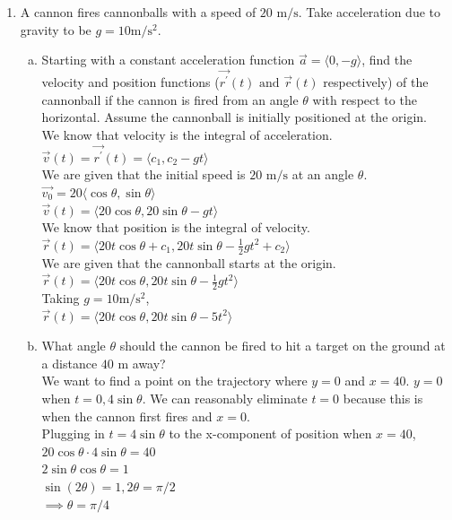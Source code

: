 \begin{enumerate}
	\item A cannon fires cannonballs with a speed of $20 \text{ m} / \text{s}$. Take acceleration due to gravity to be $g = 10 \text{m} / \text{s}^2$.
	\begin{enumerate}[a.]
		\item Starting with a constant acceleration function $\vec{a} = \langle 0, -g \rangle$, find the velocity and position functions ($\vec{r^\prime}(t) \text{ and } \vec{r}(t)$ respectively) of the cannonball if the cannon is fired from an angle $\theta$ with respect to the horizontal. Assume the cannonball is initially positioned at the origin.\\
		\indent
		We know that velocity is the integral of acceleration.\\
		$\vec{v}(t) = \vec{r^\prime}(t) = \langle c_1, c_2-gt \rangle$\\
		We are given that the initial speed is $20 \text{ m} / \text{s}$ at an angle $\theta$.\\
		$\vec{v_0} = 20\langle \cos{\theta}, \sin{\theta} \rangle$\\
		$\vec{v}(t) = \langle 20\cos{\theta}, 20\sin{\theta}-gt \rangle$\\
		We know that position is the integral of velocity.\\
		$\vec{r}(t) = \langle 20t\cos{\theta} + c_1, 20t\sin{\theta} - \frac{1}{2}gt^2 + c_2 \rangle$\\
		We are given that the cannonball starts at the origin.\\
		$\vec{r}(t) = \langle 20t\cos{\theta}, 20t\sin{\theta} - \frac{1}{2}gt^2 \rangle$\\
		Taking $g = 10 \text{m} / \text{s}^2$,\\
		$\vec{r}(t) = \langle 20t\cos{\theta}, 20t\sin{\theta}-5t^2 \rangle$\\
			
		\item What angle $\theta$ should the cannon be fired to hit a target on the ground at a distance $40\text{ m}$ away?\\
		\indent
		We want to find a point on the trajectory where $y = 0$ and $x = 40$.
		$y = 0$ when $t = 0, 4\sin{\theta}$. We can reasonably eliminate $t = 0$ because this is when the cannon first fires and $x = 0$.\\
		Plugging in $t = 4\sin{\theta}$ to the x-component of position when $x = 40$,\\
		$20\cos{\theta} \cdot 4\sin{\theta} = 40$\\
		$2\sin{\theta}\cos{\theta} = 1$\\
		$\sin{(2\theta)}=1, 2\theta = \pi/2$\\
		$\implies \theta = \pi/4$\\
	\end{enumerate}
	

\end{enumerate}
